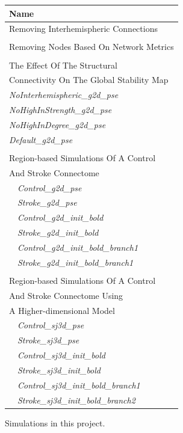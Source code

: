 \documentclass{tufte-handout}
\begin{document}
\begin{margintable}
  \centering
  \selectfont
  \begin{tabular}{l}
    \toprule
    Name                                              \\
    \midrule
    \multicolumn{1}{l}{Removing Interhemispheric Connections}\\
    \\
    \multicolumn{1}{l}{Removing Nodes Based On Network Metrics}\\
    \\
    \multicolumn{1}{l}{The Effect Of The Structural}\\
    \multicolumn{1}{l}{Connectivity On The Global Stability Map}\\
    \textit{NoInterhemispheric\_g2d\_pse}\\
    \textit{NoHighInStrength\_g2d\_pse}\\
    \textit{NoHighInDegree\_g2d\_pse}\\
    \textit{Default\_g2d\_pse}\\
     \\
	\multicolumn{1}{l}{Region-based Simulations Of A Control }\\
    \multicolumn{1}{l}{And Stroke Connectome}\\

    $\quad$\textit{Control\_g2d\_pse}           \\
    $\quad$\textit{Stroke\_g2d\_pse}             \\
    $\quad$\textit{Control\_g2d\_init\_bold} \\
    $\quad$\textit{Stroke\_g2d\_init\_bold}        \\  
    $\quad$\textit{Control\_g2d\_init\_bold\_branch1}           \\
    $\quad$\textit{Stroke\_g2d\_init\_bold\_branch1} \\ 
    \\
    \multicolumn{1}{l}{Region-based Simulations Of A Control  }\\
    \multicolumn{1}{l}{And Stroke Connectome Using}\\
    \multicolumn{1}{l}{A Higher-dimensional Model}\\
    $\quad$\textit{Control\_sj3d\_pse}\\
    $\quad$\textit{Stroke\_sj3d\_pse}\\
    $\quad$\textit{Control\_sj3d\_init\_bold}\\
    $\quad$\textit{Stroke\_sj3d\_init\_bold}\\
    $\quad$\textit{Control\_sj3d\_init\_bold\_branch1}\\
    $\quad$\textit{Stroke\_sj3d\_init\_bold\_branch2}\\
    \bottomrule
  \end{tabular}
  \caption{Simulations in this project.}
  \label{tab:normaltab}
\end{margintable}
\end{document}

